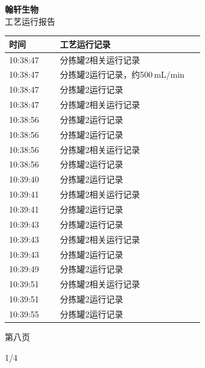 \documentclass[UTF8,10pt,a4paper,fontset=fandol]{ctexart}
\newcommand{\handwritten}[1]{#1}
\begin{document}
\begin{minipage}[t]{0.47\linewidth}
\centering
\textbf{翰轩生物}\\[-1mm]
工艺运行报告

\vspace{2mm}
\scriptsize
\begin{tabular}{|p{0.24\linewidth}|p{0.68\linewidth}|}
\hline
时间 & 工艺运行记录 \\ \hline
10:38:47 & 分拣罐2相关运行记录 \\ \hline
10:38:47 & 分拣罐2运行记录，约500\,mL/min \\ \hline
10:38:47 & 分拣罐2运行记录 \\ \hline
10:38:47 & 分拣罐2相关运行记录 \\ \hline
10:38:56 & 分拣罐2运行记录 \\ \hline
10:38:56 & 分拣罐2运行记录 \\ \hline
10:38:56 & 分拣罐2相关运行记录 \\ \hline
10:38:56 & 分拣罐2运行记录 \\ \hline
10:39:40 & 分拣罐2运行记录 \\ \hline
10:39:41 & 分拣罐2相关运行记录 \\ \hline
10:39:41 & 分拣罐2运行记录 \\ \hline
10:39:43 & 分拣罐2运行记录 \\ \hline
10:39:43 & 分拣罐2相关运行记录 \\ \hline
10:39:43 & 分拣罐2运行记录 \\ \hline
10:39:49 & 分拣罐2运行记录 \\ \hline
10:39:51 & 分拣罐2相关运行记录 \\ \hline
10:39:51 & 分拣罐2运行记录 \\ \hline
10:39:55 & 分拣罐2运行记录 \\ \hline
\end{tabular}

\vspace{1mm}

第八页

\vspace{4mm}
\handwritten{1/4}
\end{minipage}

\end{document}
